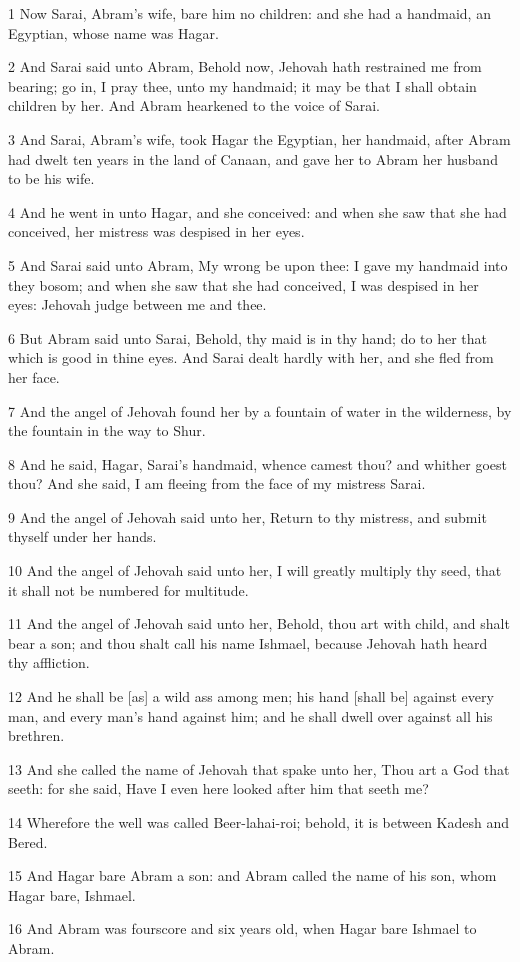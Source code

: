 \par 1 Now Sarai, Abram's wife, bare him no children: and she had a handmaid, an Egyptian, whose name was Hagar.
\par 2 And Sarai said unto Abram, Behold now, Jehovah hath restrained me from bearing; go in, I pray thee, unto my handmaid; it may be that I shall obtain children by her. And Abram hearkened to the voice of Sarai.
\par 3 And Sarai, Abram's wife, took Hagar the Egyptian, her handmaid, after Abram had dwelt ten years in the land of Canaan, and gave her to Abram her husband to be his wife.
\par 4 And he went in unto Hagar, and she conceived: and when she saw that she had conceived, her mistress was despised in her eyes.
\par 5 And Sarai said unto Abram, My wrong be upon thee: I gave my handmaid into they bosom; and when she saw that she had conceived, I was despised in her eyes: Jehovah judge between me and thee.
\par 6 But Abram said unto Sarai, Behold, thy maid is in thy hand; do to her that which is good in thine eyes. And Sarai dealt hardly with her, and she fled from her face.
\par 7 And the angel of Jehovah found her by a fountain of water in the wilderness, by the fountain in the way to Shur.
\par 8 And he said, Hagar, Sarai's handmaid, whence camest thou? and whither goest thou? And she said, I am fleeing from the face of my mistress Sarai.
\par 9 And the angel of Jehovah said unto her, Return to thy mistress, and submit thyself under her hands.
\par 10 And the angel of Jehovah said unto her, I will greatly multiply thy seed, that it shall not be numbered for multitude.
\par 11 And the angel of Jehovah said unto her, Behold, thou art with child, and shalt bear a son; and thou shalt call his name Ishmael, because Jehovah hath heard thy affliction.
\par 12 And he shall be [as] a wild ass among men; his hand [shall be] against every man, and every man's hand against him; and he shall dwell over against all his brethren.
\par 13 And she called the name of Jehovah that spake unto her, Thou art a God that seeth: for she said, Have I even here looked after him that seeth me?
\par 14 Wherefore the well was called Beer-lahai-roi; behold, it is between Kadesh and Bered.
\par 15 And Hagar bare Abram a son: and Abram called the name of his son, whom Hagar bare, Ishmael.
\par 16 And Abram was fourscore and six years old, when Hagar bare Ishmael to Abram.

